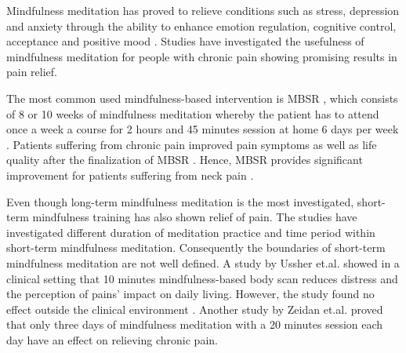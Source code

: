 Mindfulness meditation has proved to relieve conditions such as stress, depression and anxiety through the ability to enhance emotion regulation, cognitive control, acceptance and positive mood \cite{Zeidan2016, Zeidan2012}. Studies have investigated the usefulness of mindfulness meditation for people with chronic pain showing promising results in pain relief. \cite{Kabat1982,Rosenzweig2010}


The most common used mindfulness-based intervention is MBSR \cite{Cramer2012}, which consists of 8 or 10 weeks of mindfulness meditation whereby the patient has to attend once a week a course for 2 hours and 45 minutes session at home 6 days per week \cite{Kabat1982, Chiesa2010}. Patients suffering from chronic pain improved pain symptoms as well as life quality after the finalization of MBSR \cite{Zeidan2012}.
%
Hence, MBSR provides significant improvement for patients suffering from neck pain \cite{Rosenzweig2010}.

Even though long-term mindfulness meditation is the most investigated, short-term mindfulness training has also shown relief of pain. The studies have investigated different duration of meditation practice and time period within short-term mindfulness meditation. Consequently the boundaries of short-term mindfulness meditation are not well defined. A study by Ussher et.al. \cite{Ussher2012} showed in a clinical setting that 10 minutes mindfulness-based body scan reduces distress and the perception of pains’ impact on daily living. However, the study found no effect outside the clinical environment \cite{Ussher2012}. Another study by Zeidan et.al. \cite{Zeidan2012} proved that only three days of mindfulness meditation with a 20 minutes session each day have an effect on relieving chronic pain. 

